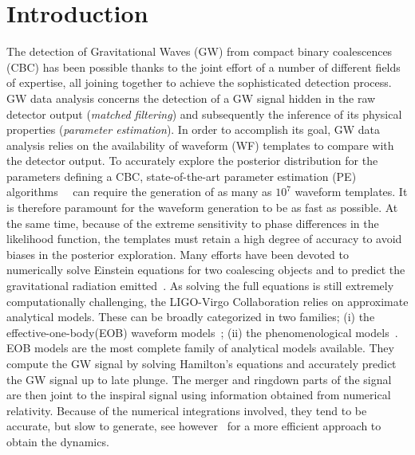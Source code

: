 \section{Introduction}
The detection of Gravitational Waves (GW) from compact binary coalescences (CBC) has been possible thanks to the joint effort of a number of different fields of expertise, all joining together to achieve the sophisticated detection process. GW data analysis concerns the detection of a GW signal hidden in the raw detector output (\textit{matched filtering}) and subsequently the inference of its physical properties (\textit{parameter estimation}). In order to accomplish its goal, GW data analysis relies on the availability of waveform (WF) templates to compare with the detector output.
To accurately explore the posterior distribution for the parameters defining a CBC, state-of-the-art parameter estimation (PE) algorithms~\cite{Aasi:2013jjl}~\cite{Veitch2014wba} can require the generation of as many as $10^7$ waveform templates. It is therefore paramount for the waveform generation to be as fast as possible. At the same time, because of the extreme sensitivity to phase differences in the likelihood  function, 
the templates must retain a high degree of accuracy to avoid biases in the posterior exploration.
Many efforts have been devoted to numerically solve Einstein equations for two coalescing objects and 
to predict the gravitational radiation emitted~\cite{}.
As solving the full equations is still extremely computationally challenging, the LIGO-Virgo Collaboration relies on approximate analytical models. 
These can be broadly categorized in  two families; (i) the effective-one-body(EOB) waveform 
models~\cite{Damour:2009kr,Chiaramello:2020ehz}; (ii) the phenomenological 
models~\cite{Khan:2015jqa,Pratten:2020ceb,Estelles:2020osj}. EOB models are the most complete family 
of analytical models available. They compute the GW signal by solving Hamilton's equations 
and accurately predict the GW signal up to late plunge. The merger and ringdown  parts of 
the signal are then joint to the inspiral signal using information obtained from numerical relativity. 
Because of the numerical integrations involved, they tend to be accurate, but slow to generate, 
see however~\cite{Nagar:2018gnk} for a more efficient approach to obtain the dynamics.

